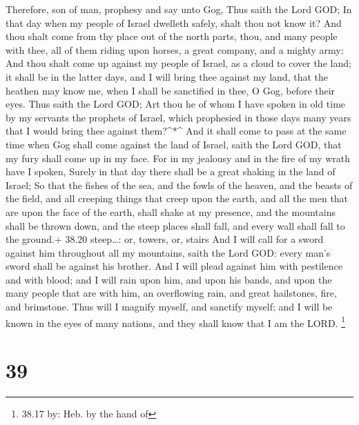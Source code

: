  Therefore, son of man, prophesy and say unto Gog, Thus
saith the Lord GOD; In that day when my people of Israel dwelleth
safely, shalt thou not know it?  And thou shalt come from
thy place out of the north parts, thou, and many people with thee, all
of them riding upon horses, a great company, and a mighty army:
 And thou shalt come up against my people of Israel, as a
cloud to cover the land; it shall be in the latter days, and I will
bring thee against my land, that the heathen may know me, when I shall
be sanctified in thee, O Gog, before their eyes.  Thus
saith the Lord GOD; Art thou he of whom I have spoken in old time by my
servants the prophets of Israel, which prophesied in those days many
years that I would bring thee against them?\^{}*\^{}  And
it shall come to pass at the same time when Gog shall come against the
land of Israel, saith the Lord GOD, that my fury shall come up in my
face.  For in my jealousy and in the fire of my wrath have
I spoken, Surely in that day there shall be a great shaking in the land
of Israel;  So that the fishes of the sea, and the fowls of
the heaven, and the beasts of the field, and all creeping things that
creep upon the earth, and all the men that are upon the face of the
earth, shall shake at my presence, and the mountains shall be thrown
down, and the steep places shall fall, and every wall shall fall to the
ground.+ 38.20 steep\ldots: or, towers, or, stairs  And I
will call for a sword against him throughout all my mountains, saith the
Lord GOD: every man's sword shall be against his brother. 
And I will plead against him with pestilence and with blood; and I will
rain upon him, and upon his bands, and upon the many people that are
with him, an overflowing rain, and great hailstones, fire, and
brimstone.  Thus will I magnify myself, and sanctify
myself; and I will be known in the eyes of many nations, and they shall
know that I am the LORD. \footnote{38.17 by: Heb. by the hand of}

\hypertarget{section-38}{%
\section{39}\label{section-38}}

